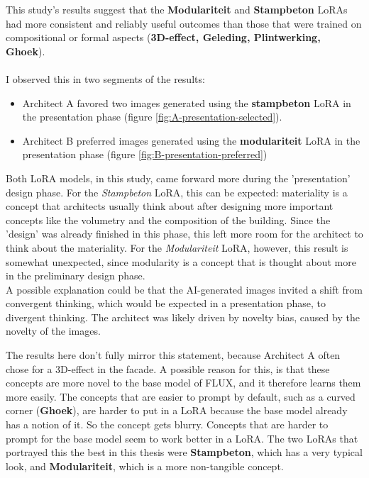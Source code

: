 This study's results suggest that the \textbf{Modulariteit} and \textbf{Stampbeton} LoRAs had more consistent and reliably useful outcomes than those that were trained on compositional or formal aspects (\textbf{3D-effect, Geleding, Plintwerking, Ghoek}).\\~\\
I observed this in two segments of the results:
\begin{itemize}
    \item Architect A favored two images generated using the \textbf{stampbeton} LoRA in the presentation phase (figure \ref{fig:A-presentation-selected}).
    \item Architect B preferred images generated using the \textbf{modulariteit} LoRA in the presentation phase (figure \ref{fig:B-presentation-preferred})
\end{itemize}
Both LoRA models, in this study, came forward more during the 'presentation' design phase. For the \textit{Stampbeton} LoRA, this can be expected: materiality is a concept that architects usually think about after designing more important concepts like the volumetry and the composition of the building. Since the 'design' was already finished in this phase, this left more room for the architect to think about the materiality. For the \textit{Modulariteit} LoRA, however, this result is somewhat unexpected, since modularity is a concept that is thought about more in the preliminary design phase. \\
A possible explanation could be that the AI-generated images invited a shift from convergent thinking, which would be expected in a presentation phase, to divergent thinking. The architect was likely driven by novelty bias, caused by the novelty of the images. 

The results here don't fully mirror this statement, because Architect A often chose for a 3D-effect in the facade. 
A possible reason for this, is that these concepts are more novel to the base model of FLUX, and it therefore learns them more easily. The concepts that are easier to prompt by default, such as a curved corner (\textbf{Ghoek}), are harder to put in a LoRA because the base model already has a notion of it. So the concept gets blurry. Concepts that are harder to prompt for the base model seem to work better in a LoRA. The two LoRAs that portrayed this the best in this thesis were \textbf{Stampbeton}, which has a very typical look, and \textbf{Modulariteit}, which is a more non-tangible concept.\\~\\

